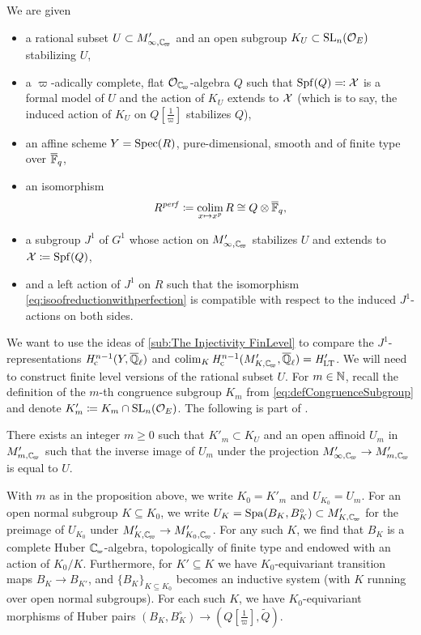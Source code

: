 \documentclass[../main.tex]{subfiles}
\begin{document}
\begin{sit}\label{sit:MiedaLTTSit}
  We are given
\begin{itemize}
  \item a rational subset $U\subset M'_{\infty, \Cp}$ and an open
    subgroup $K_U \subset \operatorname{SL}_n(\mathcal{O}_E)$ stabilizing $U$,
  \item a $\varpi$-adically complete, flat $\cO_\Cp$-algebra
    $Q$ such that $\operatorname{Spf}(Q) \eqqcolon \mathcal{X}$ is a formal model of $U$ and the action of 
    $K_U$ extends to $\mathcal{X}$ (which is to say, the induced action of $K_U$ on $Q[\tfrac 1\varpi]$ stabilizes $Q$),
  \item an affine scheme $Y=\operatorname{Spec}(R)$, pure-dimensional, smooth and 
    of finite type over ${\overline {\mathbb{F}}_q}$,
  \item an isomorphism
    \begin{equation}\label{eq:isoofreductionwithperfection}
      R^{\mathit{perf}} \coloneq \operatorname*{colim}_{x \mapsto x^p} R \cong Q \otimes {\overline{\mathbb{F}}_q},
    \end{equation}
  \item a subgroup $J^1$ of $G^1$ whose action on $M'_{\infty, \Cp}$ stabilizes
    $U$ and extends to $\mathcal{X} \coloneq \operatorname{Spf}(Q)$, 
  \item and a left action of $J^1$ on $R$ such that the isomorphism
    \eqref{eq:isoofreductionwithperfection} is compatible with respect to the
    induced $J^1$-actions on both sides.
\end{itemize}
\end{sit}

We want to use the ideas of \cref{sub:The Injectivity FinLevel} to compare the
$J^1$-representations
$\mathit H_{\mathrm{c}}^{n-1}(Y, {\overline {\mathbb{Q}}_\ell})$ and $\colim_K \hHc^{n-1}(M'_{K,\Cp}, \Qlbar) = \hH'_\LT$. 
We will need to construct finite level versions of the rational subset $U$. 
For $m \in \mathbb{N}$, recall the definition of the $m$-th congruence subgroup $K_m$ from 
\eqref{eq:defCongruenceSubgroup} and denote $K'_m \coloneq K_m \cap \operatorname{SL}_n(\mathcal{O}_E)$. 
The following is part of \cite[Proposition 4.5]{mieda2016geometric}.

\begin{prop}\label{prop:FiniteLevelU}
  There exists an integer $m \geq 0$ such that $K'_m \subset K_U$ and an open affinoid
  $U_m$ in $M'_{m, \Cp}$ such that the inverse image of $U_m$ under the projection
  $M'_{\infty, \Cp} \to M'_{m, \Cp}$ is equal to $U$. 
\end{prop}
With $m$ as in the proposition above, we write $K_0 = K'_m$ and $U_{K_0} = 
U_m$. For an open normal subgroup $K \subseteq K_0$, we write $U_K = \spa(B_K,
B^\circ_K) \subset M'_{K, \Cp}$ for the preimage of $U_{K_0}$ under 
$M_{K,\Cp}' \to M'_{K_0, \Cp}$. For any such $K$, we find
that $B_K$ is a complete Huber $\Cp$-algebra, 
topologically of finite type and endowed with an action of $K_0/K$. Furthermore,
for $K' \subseteq K$ we have $K_0$-equivariant transition maps $B_{K} \to B_{K'}$,
and $\{B_K\}_{K \subseteq K_0}$ becomes an inductive system (with $K$ running over 
open normal subgroups). For each such $K$, we have $K_0$-equivariant morphisms
of Huber pairs $(B_K, B_K^\circ) \to (Q[\tfrac 1\varpi], \tilde Q)$.
\end{document}
